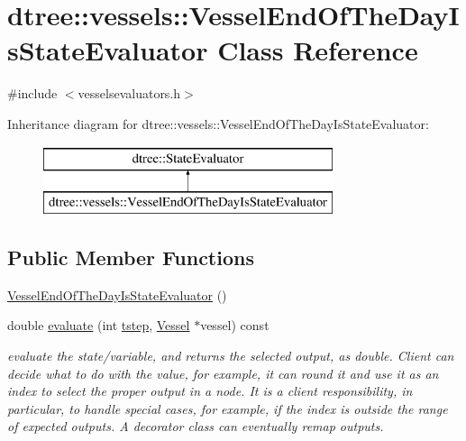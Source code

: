 \hypertarget{classdtree_1_1vessels_1_1_vessel_end_of_the_day_is_state_evaluator}{}\section{dtree\+::vessels\+::Vessel\+End\+Of\+The\+Day\+Is\+State\+Evaluator Class Reference}
\label{classdtree_1_1vessels_1_1_vessel_end_of_the_day_is_state_evaluator}


{\ttfamily \#include $<$vesselsevaluators.\+h$>$}

Inheritance diagram for dtree\+::vessels\+::Vessel\+End\+Of\+The\+Day\+Is\+State\+Evaluator\+:\begin{figure}[H]
\begin{center}
\leavevmode
\includegraphics[height=2.000000cm]{d3/d98/classdtree_1_1vessels_1_1_vessel_end_of_the_day_is_state_evaluator}
\end{center}
\end{figure}
\subsection*{Public Member Functions}
\begin{DoxyCompactItemize}
\item 
\mbox{\hyperlink{classdtree_1_1vessels_1_1_vessel_end_of_the_day_is_state_evaluator_a743278b7d3ab7de5a34c8528ac9898b8}{Vessel\+End\+Of\+The\+Day\+Is\+State\+Evaluator}} ()
\item 
double \mbox{\hyperlink{classdtree_1_1vessels_1_1_vessel_end_of_the_day_is_state_evaluator_a611ae21c2421fd848eb603b4f3e86cab}{evaluate}} (int \mbox{\hyperlink{thread__vessels_8cpp_a84bc73d278de929ec9974e1a95d9b23a}{tstep}}, \mbox{\hyperlink{class_vessel}{Vessel}} $\ast$vessel) const
\begin{DoxyCompactList}\small\item\em evaluate the state/variable, and returns the selected output, as double. Client can decide what to do with the value, for example, it can round it and use it as an index to select the proper output in a node. It is a client responsibility, in particular, to handle special cases, for example, if the index is outside the range of expected outputs. A decorator class can eventually remap outputs. \end{DoxyCompactList}\end{DoxyCompactItemize}


